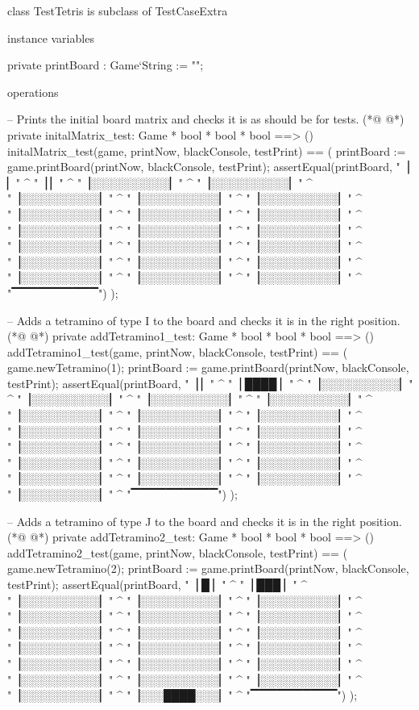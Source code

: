 \begin{vdmpp}[breaklines=true]
class TestTetris is subclass of TestCaseExtra

 instance variables
 
  private printBoard : Game`String := "";
   

 operations
 
  -- Prints the initial board matrix and checks it is as should be for tests.
(*@
\label{initalMatrix:test:11}
@*)
  private initalMatrix_test: Game * bool * bool * bool ==> ()
  initalMatrix_test(game, printNow, blackConsole, testPrint) == (
   printBoard := game.printBoard(printNow, blackConsole, testPrint);
   assertEqual(printBoard, 
    "\n▕          ▏" ^
    "\n▕          ▏" ^
    "\n▕░░░░░░░░░░▏" ^
    "\n▕░░░░░░░░░░▏" ^
    "\n▕░░░░░░░░░░▏" ^
    "\n▕░░░░░░░░░░▏" ^
    "\n▕░░░░░░░░░░▏" ^
    "\n▕░░░░░░░░░░▏" ^
    "\n▕░░░░░░░░░░▏" ^
    "\n▕░░░░░░░░░░▏" ^
    "\n▕░░░░░░░░░░▏" ^
    "\n▕░░░░░░░░░░▏" ^
    "\n▕░░░░░░░░░░▏" ^
    "\n▕░░░░░░░░░░▏" ^
    "\n▕░░░░░░░░░░▏" ^
    "\n▕░░░░░░░░░░▏" ^
    "\n▕░░░░░░░░░░▏" ^
    "\n▕░░░░░░░░░░▏" ^
    "\n▕░░░░░░░░░░▏" ^
    "\n▕░░░░░░░░░░▏" ^
    "\n▕░░░░░░░░░░▏" ^
    "\n▕░░░░░░░░░░▏" ^
    "\n ▔▔▔▔▔▔▔▔▔▔")
  ); 

  -- Adds a tetramino of type I to the board and checks it is in the right position.
(*@
\label{addTetramino1:test:41}
@*)
  private addTetramino1_test: Game * bool * bool * bool ==> ()
  addTetramino1_test(game, printNow, blackConsole, testPrint) == (  
   game.newTetramino(1);
   printBoard := game.printBoard(printNow, blackConsole, testPrint);
   assertEqual(printBoard, 
    "\n▕          ▏" ^
    "\n▕   ████   ▏" ^
    "\n▕░░░░░░░░░░▏" ^
    "\n▕░░░░░░░░░░▏" ^
    "\n▕░░░░░░░░░░▏" ^
    "\n▕░░░░░░░░░░▏" ^
    "\n▕░░░░░░░░░░▏" ^
    "\n▕░░░░░░░░░░▏" ^
    "\n▕░░░░░░░░░░▏" ^
    "\n▕░░░░░░░░░░▏" ^
    "\n▕░░░░░░░░░░▏" ^
    "\n▕░░░░░░░░░░▏" ^
    "\n▕░░░░░░░░░░▏" ^
    "\n▕░░░░░░░░░░▏" ^
    "\n▕░░░░░░░░░░▏" ^
    "\n▕░░░░░░░░░░▏" ^
    "\n▕░░░░░░░░░░▏" ^
    "\n▕░░░░░░░░░░▏" ^
    "\n▕░░░░░░░░░░▏" ^
    "\n▕░░░░░░░░░░▏" ^
    "\n▕░░░░░░░░░░▏" ^
    "\n▕░░░░░░░░░░▏" ^
    "\n ▔▔▔▔▔▔▔▔▔▔")
  );

  -- Adds a tetramino of type J to the board and checks it is in the right position.
(*@
\label{addTetramino2:test:72}
@*)
  private addTetramino2_test: Game * bool * bool * bool ==> ()
  addTetramino2_test(game, printNow, blackConsole, testPrint) == (  
   game.newTetramino(2);
   printBoard := game.printBoard(printNow, blackConsole, testPrint);
   assertEqual(printBoard, 
    "\n▕   █      ▏" ^
    "\n▕   ███    ▏" ^
    "\n▕░░░░░░░░░░▏" ^
    "\n▕░░░░░░░░░░▏" ^
    "\n▕░░░░░░░░░░▏" ^
    "\n▕░░░░░░░░░░▏" ^
    "\n▕░░░░░░░░░░▏" ^
    "\n▕░░░░░░░░░░▏" ^
    "\n▕░░░░░░░░░░▏" ^
    "\n▕░░░░░░░░░░▏" ^
    "\n▕░░░░░░░░░░▏" ^
    "\n▕░░░░░░░░░░▏" ^
    "\n▕░░░░░░░░░░▏" ^
    "\n▕░░░░░░░░░░▏" ^
    "\n▕░░░░░░░░░░▏" ^
    "\n▕░░░░░░░░░░▏" ^
    "\n▕░░░░░░░░░░▏" ^
    "\n▕░░░░░░░░░░▏" ^
    "\n▕░░░░░░░░░░▏" ^
    "\n▕░░░░░░░░░░▏" ^
    "\n▕░░░░░░░░░░▏" ^
    "\n▕░░░████░░░▏" ^
    "\n ▔▔▔▔▔▔▔▔▔▔")
  );


\end{vdmpp}
